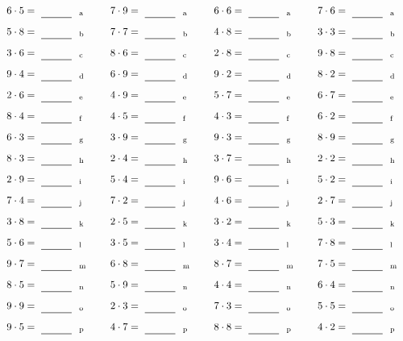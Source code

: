 \documentclass
[
  draft    = true,
  fontsize = 11pt,
  parskip  = half-
]
{scrartcl}
\begin{document}
\par\vfill\par
\begin{align*}
    \pline{6\cdot5}&=\rline{a}
  & \pline{7\cdot9}&=\rline{a}
  & \pline{6\cdot6}&=\rline{a}
  & \pline{7\cdot6}&=\rline{a} \\[1ex]
    \pline{5\cdot8}&=\rline{b}
  & \pline{7\cdot7}&=\rline{b}
  & \pline{4\cdot8}&=\rline{b}
  & \pline{3\cdot3}&=\rline{b} \\[1ex]
    \pline{3\cdot6}&=\rline{c}
  & \pline{8\cdot6}&=\rline{c}
  & \pline{2\cdot8}&=\rline{c}
  & \pline{9\cdot8}&=\rline{c} \\[1ex]
    \pline{9\cdot4}&=\rline{d}
  & \pline{6\cdot9}&=\rline{d}
  & \pline{9\cdot2}&=\rline{d}
  & \pline{8\cdot2}&=\rline{d} \\[1ex]
    \pline{2\cdot6}&=\rline{e}
  & \pline{4\cdot9}&=\rline{e}
  & \pline{5\cdot7}&=\rline{e}
  & \pline{6\cdot7}&=\rline{e} \\[1ex]
    \pline{8\cdot4}&=\rline{f}
  & \pline{4\cdot5}&=\rline{f}
  & \pline{4\cdot3}&=\rline{f}
  & \pline{6\cdot2}&=\rline{f} \\[1ex]
    \pline{6\cdot3}&=\rline{g}
  & \pline{3\cdot9}&=\rline{g}
  & \pline{9\cdot3}&=\rline{g}
  & \pline{8\cdot9}&=\rline{g} \\[1ex]
    \pline{8\cdot3}&=\rline{h}
  & \pline{2\cdot4}&=\rline{h}
  & \pline{3\cdot7}&=\rline{h}
  & \pline{2\cdot2}&=\rline{h} \\[1ex]
    \pline{2\cdot9}&=\rline{i}
  & \pline{5\cdot4}&=\rline{i}
  & \pline{9\cdot6}&=\rline{i}
  & \pline{5\cdot2}&=\rline{i} \\[1ex]
    \pline{7\cdot4}&=\rline{j}
  & \pline{7\cdot2}&=\rline{j}
  & \pline{4\cdot6}&=\rline{j}
  & \pline{2\cdot7}&=\rline{j} \\[1ex]
    \pline{3\cdot8}&=\rline{k}
  & \pline{2\cdot5}&=\rline{k}
  & \pline{3\cdot2}&=\rline{k}
  & \pline{5\cdot3}&=\rline{k} \\[1ex]
    \pline{5\cdot6}&=\rline{l}
  & \pline{3\cdot5}&=\rline{l}
  & \pline{3\cdot4}&=\rline{l}
  & \pline{7\cdot8}&=\rline{l} \\[1ex]
    \pline{9\cdot7}&=\rline{m}
  & \pline{6\cdot8}&=\rline{m}
  & \pline{8\cdot7}&=\rline{m}
  & \pline{7\cdot5}&=\rline{m} \\[1ex]
    \pline{8\cdot5}&=\rline{n}
  & \pline{5\cdot9}&=\rline{n}
  & \pline{4\cdot4}&=\rline{n}
  & \pline{6\cdot4}&=\rline{n} \\[1ex]
    \pline{9\cdot9}&=\rline{o}
  & \pline{2\cdot3}&=\rline{o}
  & \pline{7\cdot3}&=\rline{o}
  & \pline{5\cdot5}&=\rline{o} \\[1ex]
    \pline{9\cdot5}&=\rline{p}
  & \pline{4\cdot7}&=\rline{p}
  & \pline{8\cdot8}&=\rline{p}
  & \pline{4\cdot2}&=\rline{p}
\end{align*}
\end{document}
